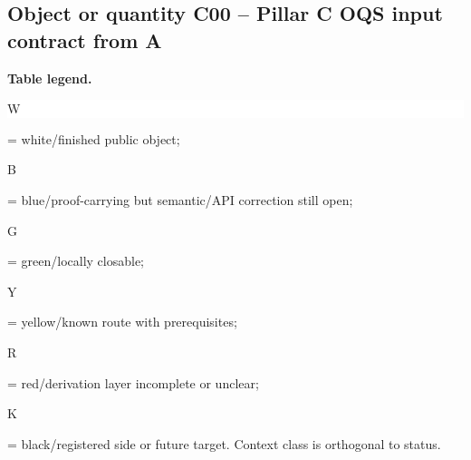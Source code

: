 \subsection*{Object or quantity C00 -- Pillar C OQS input contract from A}
\hypertarget{objproof:C00}{}
\par\smallskip\noindent\begin{minipage}{0.99\linewidth}\footnotesize\raggedright\textbf{Table legend.} \colorbox{white}{\strut W} = white/finished public object; \colorbox{cyan!20}{\strut B} = blue/proof-carrying but semantic/API correction still open; \colorbox{green!18}{\strut G} = green/locally closable; \colorbox{yellow!25}{\strut Y} = yellow/known route with prerequisites; \colorbox{red!20}{\strut R} = red/derivation layer incomplete or unclear; \colorbox{black!18}{\strut K} = black/registered side or future target. Context class is orthogonal to status.\end{minipage}\par\vspace{0.25em}
